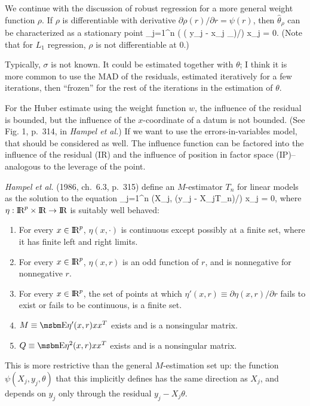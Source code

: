 We continue with the discussion of robust regression for a more general weight
function $\rho$.
If $\rho$ is differentiable with derivative $\partial \rho(r)/\partial r = \psi(r)$,
then $\hat{\theta}_\rho$ can be characterized as
a stationary point
\beq
    \sum_{j=1}^n \psi \left ( ( y_j - x_j \hat{\theta}_\rho )/\sigma \right ) x_j = 0.
\eeq
(Note that for $L_1$ regression, $\rho$ is not differentiable at 0.)

Typically, $\sigma$ is not known.
It could be estimated together with $\theta$; I think it is more common to
use the MAD of the residuals, estimated iteratively for a few iterations, then
``frozen'' for the rest of the iterations in the estimation of $\theta$.

For the Huber estimate using the weight function $w$, the influence of the residual
is bounded, but the influence of the $x$-coordinate of a datum is not bounded.
(See Fig. 1, p.~314, in {\em Hampel et al.\/})
If we want to use the errors-in-variables model, that should be considered as well.
The influence function can be factored into the influence of the residual (IR)
and the influence of position in factor space (IP)--analogous to the leverage
of the point.

{\em Hampel et al.\/} (1986, ch.~6.3, p.~315) define an $M$-estimator $T_n$ for linear
models as the solution to the equation
\beq
    \sum_{j=1}^n \eta \left (X_j, (y_j - X_jT_n)/\sigma \right ) x_j = 0,
\eeq
where $\eta: \hbox{I\kern-.17em\hbox{R}}^p \times \hbox{I\kern-.17em\hbox{R}} \rightarrow \hbox{I\kern-.17em\hbox{R}}$ is suitably well behaved:
\begin{enumerate}
    \item
        For every $x \in \hbox{I\kern-.17em\hbox{R}}^p$, $\eta(x, \cdot)$ is continuous except possibly
        at a finite set, where it has finite left and right limits.
    \item
        For every $x \in \hbox{I\kern-.17em\hbox{R}}^p$, $\eta(x, r)$ is an odd function of $r$, and is
        nonnegative for nonnegative $r$.
    \item
        For every $x \in \hbox{I\kern-.17em\hbox{R}}^p$, the set of points at which
        $\eta'(x, r) \equiv \partial \eta(x, r)/\partial r$ fails to exist or fails to
        be continuous, is a finite set.
    \item
        $M \equiv \EE \eta'(x, r) x x^T$ exists and is a nonsingular matrix.
    \item
        $Q \equiv \EE \eta^2(x, r) x x^T$ exists and is a nonsingular matrix.
\end{enumerate}
This is more restrictive than the general $M$-estimation set up: the function
$\psi(X_j, y_j, \theta)$ that this implicitly defines has the same direction
as $X_j$, and depends on $y_j$ only through the residual $y_j - X_j \theta$.


